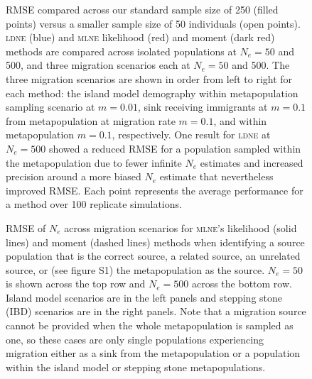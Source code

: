 \begin{figure}[ht]
\centering
{}
\caption[RMSE compared across sample sizes.]{RMSE compared across our standard sample size of 250 (filled points) versus a smaller sample size of 50 individuals (open points). \textsc{ldne} (blue) and \textsc{mlne} likelihood (red) and moment (dark red) methods are compared across isolated populations at $N_e = 50$ and 500, and three migration scenarios each at $N_e = 50$ and 500. The three migration scenarios are shown in order from left to right for each method: the island model demography within metapopulation sampling scenario at $m = 0.01$, sink receiving immigrants at $m = 0.1$ from metapopulation at migration rate $m = 0.1$, and within metapopulation $m = 0.1$, respectively. One result for \textsc{ldne} at $N_e = 500$ showed a reduced RMSE for a population sampled within the metapopulation due to fewer infinite $N_e$ estimates and increased precision around a more biased $N_e$ estimate that nevertheless improved RMSE. Each point represents the average performance for a method over 100 replicate simulations.}
\label{fig:supp_rmsesamp}
\end{figure}


\begin{figure}[ht]
\centering
{}
\caption[RMSE of $N_e$ across migration scenarios.]{RMSE of $N_e$ across migration scenarios for \textsc{mlne}'s likelihood (solid lines) and moment (dashed lines) methods when identifying a source population that is the correct source, a related source, an unrelated source, or (see figure S1) the metapopulation as the source. $N_e = 50$ is shown across the top row and $N_e = 500$ across the bottom row. Island model scenarios are in the left panels and stepping stone (IBD) scenarios are in the right panels. Note that a migration source cannot be provided when the whole metapopulation is sampled as one, so these cases are only single populations experiencing migration either as a sink from the metapopulation or a population within the island model or stepping stone metapopulations.}
\label{fig:supp_rmsemig}
\end{figure}


